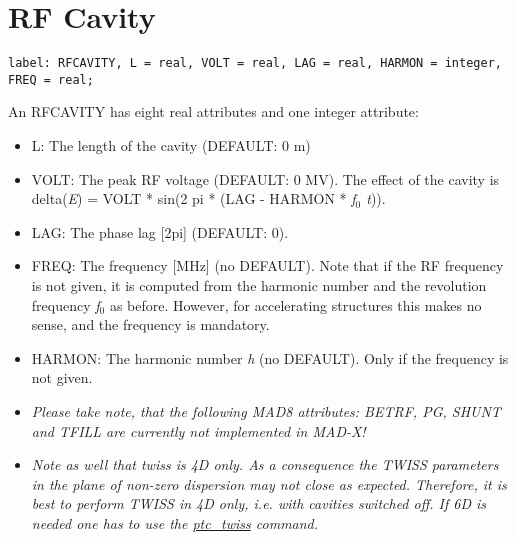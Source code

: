 
\section{RF Cavity}
\label{sec:rf_cavity}


\begin{verbatim}
label: RFCAVITY, L = real, VOLT = real, LAG = real, HARMON = integer, FREQ = real;                  
\end{verbatim} 



An RFCAVITY has eight real attributes and one integer attribute: 
\begin{itemize}
   \item L: The length of the cavity (DEFAULT: 0 m) 
   \item VOLT: The peak RF voltage (DEFAULT: 0 MV). The effect of the cavity is \\
     delta(\textit{E}) = VOLT * sin(2 pi * (LAG - HARMON * \textit{f$_0$ t})). 
   \item LAG: The phase lag [2pi] (DEFAULT: 0). 
   \item FREQ: The frequency [MHz] (no DEFAULT). Note that if the RF
     frequency is not given, it is computed from the harmonic number and
     the revolution frequency \textit{f$_0$} as before. However, for
     accelerating structures this makes no sense, and the frequency is
     mandatory.  
   \item HARMON: The harmonic number \textit{h} (no DEFAULT). Only if
     the frequency is not given.  
   \item \textit{ Please take note, that the following MAD8 attributes:
     BETRF, PG, SHUNT and TFILL are currently not implemented in MAD-X!}    

   \item \textit{ Note as well that twiss is 4D only. As a consequence
     the TWISS parameters in the plane of non-zero dispersion may not
     close as expected. Therefore, it is best to perform TWISS in 4D
     only, i.e. with cavities switched off. If 6D is needed one has to
     use the \href{../ptc_twiss/ptc_twiss.html}{ptc\_twiss} command. } 
\end{itemize}  

